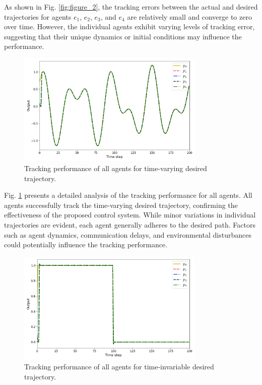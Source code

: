 \documentclass[journal,onecolumn]{IEEEtran}
\begin{document}
As shown in Fig. \ref{fig:figure_2}, the tracking errors between the actual and desired trajectories for agents $e_1$, $e_2$, $e_3$, and $e_4$ are relatively small and converge to zero over time. However, the individual agents exhibit varying levels of tracking error, suggesting that their unique dynamics or initial conditions may influence the performance.

\begin{figure}[H]
    \centering
    \includegraphics[width=0.8\textwidth]{Figure_1.png}
    \caption{Tracking performance of all agents for time-varying desired trajectory.}
    \label{fig:figure_3} %
\end{figure}

Fig. \ref{fig:figure_3} presents a detailed analysis of the tracking performance for all agents. All agents successfully track the time-varying desired trajectory, confirming the effectiveness of the proposed control system. While minor variations in individual trajectories are evident, each agent generally adheres to the desired path. Factors such as agent dynamics, communication delays, and environmental disturbances could potentially influence the tracking performance.

\begin{figure}[H]
    \centering
    \includegraphics[width=0.8\textwidth]{Figure_4.png}
    \caption{Tracking performance of all agents for time-invariable desired trajectory.}
    \label{fig:figure_4} %
\end{figure}
\end{document}
